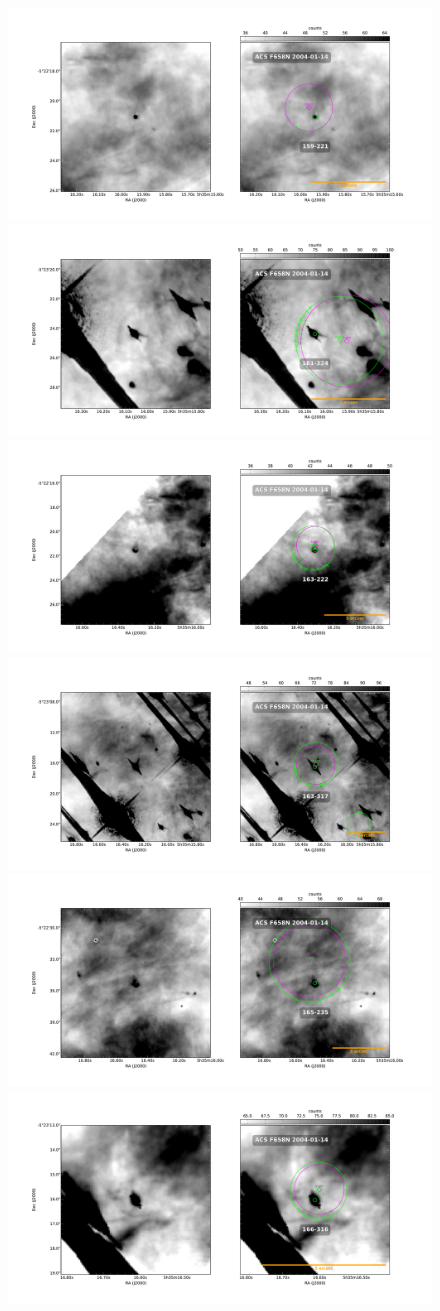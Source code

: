 \documentclass{article}
\begin{document}
\begin{figure}
  \centering
   \includegraphics[width=0.5\linewidth]{j8oc01010_wcs/159-221-Bally_01-images.pdf}
   \includegraphics[width=0.5\linewidth]{j8oc01010_wcs/161-324-Bally_01-images.pdf}
   \includegraphics[width=0.5\linewidth]{j8oc01010_wcs/163-222-Bally_01-images.pdf}
   \includegraphics[width=0.5\linewidth]{j8oc01010_wcs/163-317-Bally_01-images.pdf}
   \includegraphics[width=0.5\linewidth]{j8oc01010_wcs/165-235-Bally_01-images.pdf}
   \includegraphics[width=0.5\linewidth]{j8oc01010_wcs/166-316-Bally_01-images.pdf}
  \label{fig:images}
\end{figure}
\end{document}

